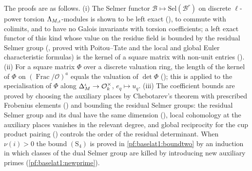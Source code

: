 The proofs are as follows. (i) The Selmer functor $\mathcal B\mapsto\mathrm{Sel}(\mathcal B^r)$ on discrete
$\ell$-power torsion $\Lambda_{M,\iota}$-modules is shown to be left exact
(), to commute with colimits, and to have
no Galois invariants with torsion coefficients; a left exact functor of this kind whose value on the residue field is
bounded by the residual Selmer group (,
proved with Poitou--Tate and the local and global Euler characteristic formulas) is the kernel of a square matrix
with non-unit entries (). (ii) For a square
matrix $\Phi$ over a discrete valuation ring, the length of the kernel of $\Phi$ on $(\operatorname{Frac}/\mathcal
O)^a$ equals the valuation of $\det\Phi$ (); this is
applied to the specialisation of $\Phi$ along $\Delta_M^\iota\to\mathcal O_k^\times$, $e_q\mapsto u_q$. (iii) The
coefficient bounds are proved by choosing the auxiliary places by Chebotarev's theorem with prescribed Frobenius
elements () and bounding the residual Selmer
groups: the residual Selmer group and its dual have the same dimension
(), local cohomology at the auxiliary places vanishes in
the relevant degree, and global reciprocity for the cup product pairing
() controls the order of the residual determinant. When $\nu(i)>0$
the bound $(\mathrm{S}_4)$ is proved in \cref{pf:baselat1:boundtwo} by an induction in which classes of the dual Selmer
group are killed by introducing new auxiliary primes (\cref{pf:baselat1:newprime}).

